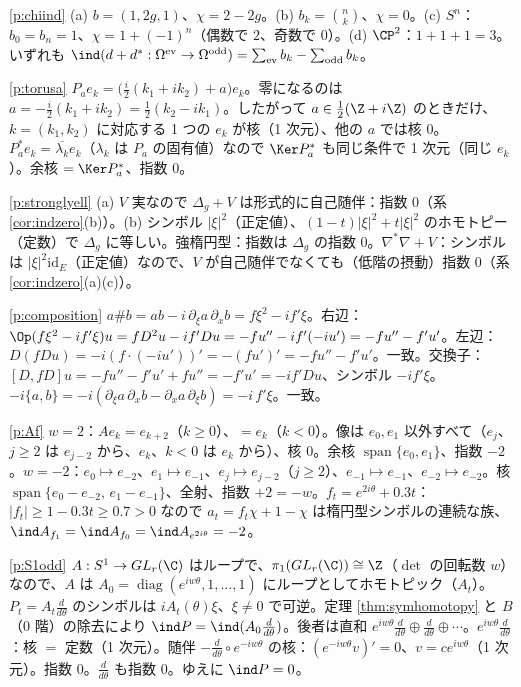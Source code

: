 \begin{sol}{\ref{p:chiind}}
(a) $b=(1,2g,1)$、$\chi=2-2g$。(b) $b_k=\binom nk$、$\chi=0$。(c) $S^n$：$b_0=b_n=1$、$\chi=1+(-1)^n$（偶数で $2$、奇数で $0$）。(d) $\CP^2$：$1+1+1=3$。いずれも $\ind(d+d^*:\Omega^{\rm ev}\to\Omega^{\rm odd})=\sum_{\rm ev}b_k-\sum_{\rm odd}b_k$。
\end{sol}
\begin{sol}{\ref{p:torusa}}
$P_ae_k=\bigl(\frac i2(k_1+ik_2)+a\bigr)e_k$。零になるのは $a=-\frac i2(k_1+ik_2)=\frac12(k_2-ik_1)$。したがって $a\in\frac12(\Z+i\Z)$ のときだけ、$k=(k_1,k_2)$ に対応する 1 つの $e_k$ が核（1 次元）、他の $a$ では核 $0$。$P_a^*e_k=\overline{\lambda_k}e_k$（$\lambda_k$ は $P_a$ の固有値）なので $\Ker P_a^*$ も同じ条件で 1 次元（同じ $e_k$）。余核 $=\Ker P_a^*$、指数 $0$。
\end{sol}
\begin{sol}{\ref{p:stronglyell}}
(a) $V$ 実なので $\Delta_g+V$ は形式的に自己随伴：指数 $0$（系 \ref{cor:indzero}(b)）。(b) シンボル $|\xi|^2$（正定値）、$(1-t)|\xi|^2+t|\xi|^2$ のホモトピー（定数）で $\Delta_g$ に等しい。強楕円型：指数は $\Delta_g$ の指数 $0$。$\nabla^*\nabla+V$：シンボルは $|\xi|^2\mathrm{id}_E$（正定値）なので、$V$ が自己随伴でなくても（低階の摂動）指数 $0$（系 \ref{cor:indzero}(a)(c)）。
\end{sol}
\begin{sol}{\ref{p:composition}}
$a\#b=ab-i\,\partial_\xi a\,\partial_xb=f\xi^2-if'\xi$。右辺：$\Op(f\xi^2-if'\xi)u=fD^2u-if'Du=-fu''-if'(-iu')=-fu''-f'u'$。左辺：$D(fDu)=-i(f\cdot(-iu'))'=-(fu')'=-fu''-f'u'$。一致。交換子：$[D,fD]u=-fu''-f'u'+fu''=-f'u'=-if'Du$、シンボル $-if'\xi$。$-i\{a,b\}=-i(\partial_\xi a\,\partial_xb-\partial_xa\,\partial_\xi b)=-i\,f'\xi$。一致。
\end{sol}
\begin{sol}{\ref{p:Af}}
$w=2$：$A e_k=e_{k+2}$（$k\ge0$）、$=e_k$（$k<0$）。像は $e_0,e_1$ 以外すべて（$e_{j}$、$j\ge2$ は $e_{j-2}$ から、$e_k$、$k<0$ は $e_k$ から）、核 $0$。余核 $\operatorname{span}\{e_0,e_1\}$、指数 $-2$。$w=-2$：$e_0\mapsto e_{-2}$、$e_1\mapsto e_{-1}$、$e_j\mapsto e_{j-2}$（$j\ge2$）、$e_{-1}\mapsto e_{-1}$、$e_{-2}\mapsto e_{-2}$。核 $\operatorname{span}\{e_0-e_{-2},\,e_1-e_{-1}\}$、全射、指数 $+2=-w$。$f_t=e^{2i\theta}+0.3t$：$|f_t|\ge1-0.3t\ge0.7>0$ なので $a_t=f_t\chi+1-\chi$ は楕円型シンボルの連続な族、$\ind A_{f_1}=\ind A_{f_0}=\ind A_{e^{2i\theta}}=-2$。
\end{sol}
\begin{sol}{\ref{p:S1odd}}
$A:S^1\to GL_r(\C)$ はループで、$\pi_1(GL_r(\C))\cong\Z$（$\det$ の回転数 $w$）なので、$A$ は $A_0=\operatorname{diag}(e^{iw\theta},1,\dots,1)$ にループとしてホモトピック（$A_t$）。$P_t=A_t\frac d{d\theta}$ のシンボルは $iA_t(\theta)\xi$、$\xi\ne0$ で可逆。定理 \ref{thm:symhomotopy} と $B$（0 階）の除去により $\ind P=\ind(A_0\frac d{d\theta})$。後者は直和 $e^{iw\theta}\frac d{d\theta}\oplus\frac d{d\theta}\oplus\cdots$。$e^{iw\theta}\frac d{d\theta}$：核 $=$ 定数（1 次元）。随伴 $-\frac d{d\theta}\circ e^{-iw\theta}$ の核：$(e^{-iw\theta}v)'=0$、$v=ce^{iw\theta}$（1 次元）。指数 $0$。$\frac d{d\theta}$ も指数 $0$。ゆえに $\ind P=0$。
\end{sol}

